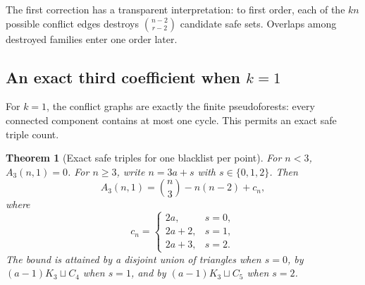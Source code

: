 \documentclass[11pt]{article}
\newtheorem{theorem}{Theorem}[section]
\theoremstyle{definition}
\theoremstyle{remark}
\begin{document}
The first correction has a transparent interpretation: to first order, each
of the $kn$ possible conflict edges destroys
$\binom{n-2}{r-2}$ candidate safe sets.  Overlaps among destroyed families
enter one order later.

\subsection{An exact third coefficient when \texorpdfstring{$k=1$}{k=1}}
For $k=1$, the conflict graphs are exactly the finite pseudoforests: every
connected component contains at most one cycle.  This permits an exact safe
triple count.

\begin{theorem}[Exact safe triples for one blacklist per point]
\label{fbl:thm:k1-triples}
For $n<3$, $A_3(n,1)=0$.  For $n\ge3$, write $n=3a+s$ with
$s\in\{0,1,2\}$.  Then
\begin{equation}\label{fbl:eq:k1-triples}
 \boxed{
 A_3(n,1)
 =\binom n3-n(n-2)+c_n, }
\end{equation}
where
\begin{equation}\label{fbl:eq:cn}
 c_n=
 \begin{cases}
    2a,   &s=0,\\
    2a+2, &s=1,\\
    2a+3, &s=2.
 \end{cases}
\end{equation}
The bound is attained by a disjoint union of triangles when $s=0$, by
$(a-1)K_3\sqcup C_4$ when $s=1$, and by
$(a-1)K_3\sqcup C_5$ when $s=2$.
\end{theorem}
\end{document}
